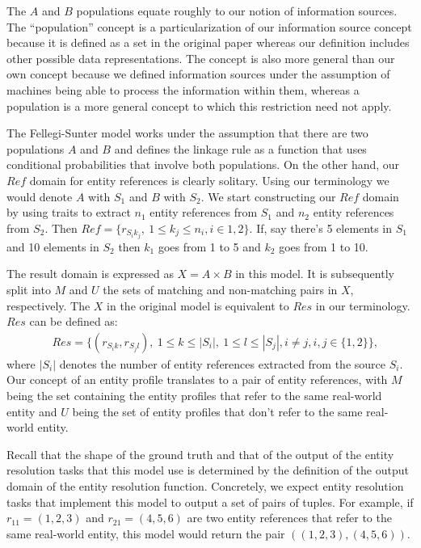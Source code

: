 \documentclass[lettersize,journal]{IEEEtran}
\begin{document}
    The $A$ and $B$ populations equate roughly to our notion of information
    sources.
    The ``population'' concept is a particularization of our information source
    concept because it is defined as a set in the original paper whereas our
    definition includes other possible data representations.
    The concept is also more general than our own concept because we defined
    information sources under the assumption of machines being able to process
    the information within them, whereas a population is a more general concept
    to which this restriction need not apply.

    The Fellegi-Sunter model works under the assumption that there are two
    populations $A$ and $B$ and defines the linkage rule as a function that uses
    conditional probabilities that involve both populations.
    On the other hand, our $Ref$ domain for entity references is clearly
    solitary.
    Using our terminology we would denote $A$ with $S_1$ and $B$ with $S_2$.
    We start constructing our $Ref$ domain by using traits to extract $n_1$
    entity references from $S_1$ and $n_2$ entity references from $S_2$.
    Then $Ref = \{r_{{S_i}{k_j}},~1 \leq k_j \leq n_i, i \in {1, 2} \}$.
    If, say there's 5 elements in $S_1$ and 10 elements in $S_2$ then $k_1$ goes
    from 1 to 5 and $k_2$ goes from 1 to 10.

    The result domain is expressed as $X = A \times B$ in this model.
    It is subsequently split into $M$ and $U$ the sets of matching and
    non-matching pairs in $X$, respectively.
    The $X$ in the original model is equivalent to $Res$ in our terminology.
    $Res$ can be defined as:
    \begin{align}
        &Res = \{(r_{{S_i}{k}}, r_{{S_j}{l}}),~1 \leq k \leq |S_i|,~1
        \leq l \leq |S_j|, i \neq j, i,j \in \{1, 2\}\}\textrm{,}\nonumber
    \end{align}
    where $|S_i|$ denotes the number of entity references extracted from the
    source $S_i$.
    Our concept of an entity profile translates to a pair of entity references,
    with $M$ being the set containing the entity profiles that refer to the same
    real-world entity and $U$ being the set of entity profiles that don't refer
    to the same real-world entity.

    Recall that the shape of the ground truth and that of the output of the
    entity resolution tasks that this model use is determined by the definition
    of the output domain of the entity resolution function.
    Concretely, we expect entity resolution tasks that implement this model to
    output a set of pairs of tuples.
    For example, if $r_{11}=(1, 2, 3)$ and $r_{21}=(4, 5, 6)$ are two entity
    references that refer to the same real-world entity, this model would return
    the pair $((1, 2, 3), (4, 5, 6))$.
\end{document}
